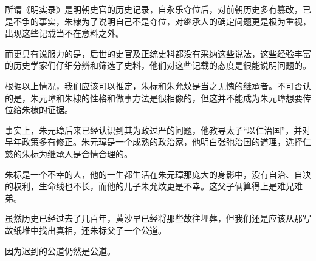 \begin{multicols}{\theparacolNo}
		所谓《明实录》是明朝史官的历史记录，自永乐夺位后，对前朝历史多有篡改，已是不争的事实，朱棣为了说明自己不是夺位，对继承人的确定问题更是极为重视，出现这些记载当不在意料之外。

		而更具有说服力的是，后世的史官及正统史料都没有采纳这些说法，这些经验丰富的历史学家们仔细分辨和筛选了史料，他们对这些记载的态度是很能说明问题的。

		根据以上情况，我们应该可以推定，朱标和朱允炆是当之无愧的继承者。不可否认的是，朱元璋和朱棣的性格和做事方法是很相像的，但这并不能成为朱元璋想要传位给朱棣的证据。

		事实上，朱元璋后来已经认识到其为政过严的问题，他教导太子“以仁治国”，并对早年政策多有修正。朱元璋是一个成熟的政治家，他明白张弛治国的道理，选择仁慈的朱标为继承人是合情合理的。

		朱标是一个不幸的人，他的一生都生活在朱元璋那庞大的身影中，没有自治、自决的权利，生命线也不长，而他的儿子朱允炆更是不幸。这父子俩算得上是难兄难弟。

		虽然历史已经过去了几百年，黄沙早已经将那些故往埋葬，但我们还是应该从那写故纸堆中找出真相，还朱标父子一个公道。

		因为迟到的公道仍然是公道。
		\ifnum{}
	\end{multicols}
\fi
\newpage
